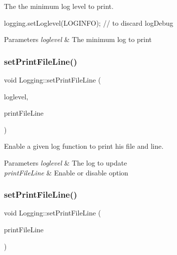 The the minimum log level to print. 

logging.\+set\+Loglevel(\+L\+O\+G\+I\+N\+F\+O); // to discard log\+Debug


\begin{DoxyParams}{Parameters}
{\em loglevel} & The minimum log to print \\
\hline
\end{DoxyParams}
\mbox{\label{class_logging_a3562c02cd1399d5a2a4c3d74fcabd297}} 
\subsubsection{\texorpdfstring{set\+Print\+File\+Line()}{setPrintFileLine()}\hspace{0.1cm}{\footnotesize\ttfamily [1/2]}}
{\footnotesize\ttfamily void Logging\+::set\+Print\+File\+Line (\begin{DoxyParamCaption}\item[{e\+Loglevel}]{loglevel,  }\item[{bool}]{print\+File\+Line }\end{DoxyParamCaption})}



Enable a given log function to print his file and line. 


\begin{DoxyParams}{Parameters}
{\em loglevel} & The log to update \\
\hline
{\em print\+File\+Line} & Enable or disable option \\
\hline
\end{DoxyParams}
\mbox{\label{class_logging_ac1d4bfabbd4cc805c22bf080441a912a}} 
\subsubsection{\texorpdfstring{set\+Print\+File\+Line()}{setPrintFileLine()}\hspace{0.1cm}{\footnotesize\ttfamily [2/2]}}
{\footnotesize\ttfamily void Logging\+::set\+Print\+File\+Line (\begin{DoxyParamCaption}\item[{bool}]{print\+File\+Line }\end{DoxyParamCaption})}



